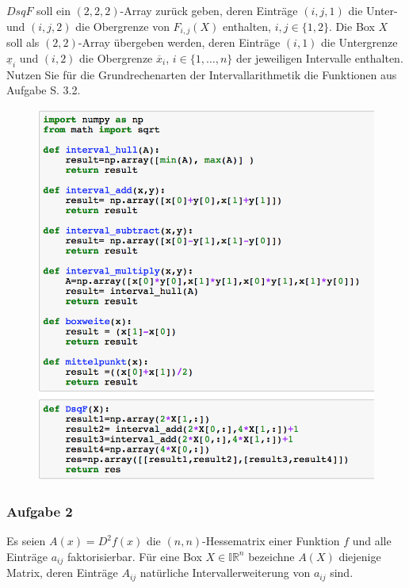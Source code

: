 \documentclass[12pt]{extreport} %
\begin{document}
\begin{enumerate}
		$DsqF$ soll ein $(2, 2, 2)$-Array zurück geben, deren Einträge $(i, j, 1)$ die Unter- und $(i, j, 2)$ die Obergrenze von $F_{i,j}(X)$ enthalten, $i, j \in \{1, 2\}$. Die Box $X$ soll als $(2,2)$-Array übergeben werden, deren Einträge $(i, 1)$ die Untergrenze $\underline{x}_i$ und $(i, 2)$ die Obergrenze $\overline{x}_i$, $i \in \{1, \dotsc, n \}$ der jeweiligen Intervalle enthalten. Nutzen Sie für die Grundrechenarten der Intervallarithmetik die Funktionen aus Aufgabe S. 3.2.
			\begin{figure}[h!] \centering
				\includegraphics[scale=.525]{img/su2iv-i}
			\end{figure}
\end{enumerate}
 
\newpage

\subsubsection*{Aufgabe 2}


Es seien $A(x) = D^2f(x)$ die $(n,n)$-Hessematrix einer Funktion $f$ und alle Einträge $a_{ij}$ faktorisierbar. Für eine Box $X \in \mathbb{IR}^n$ bezeichne $A(X)$ diejenige Matrix, deren Einträge $A_{ij}$ natürliche Intervallerweiterung von $a_{ij}$ sind. ~\smallskip
\end{document}
